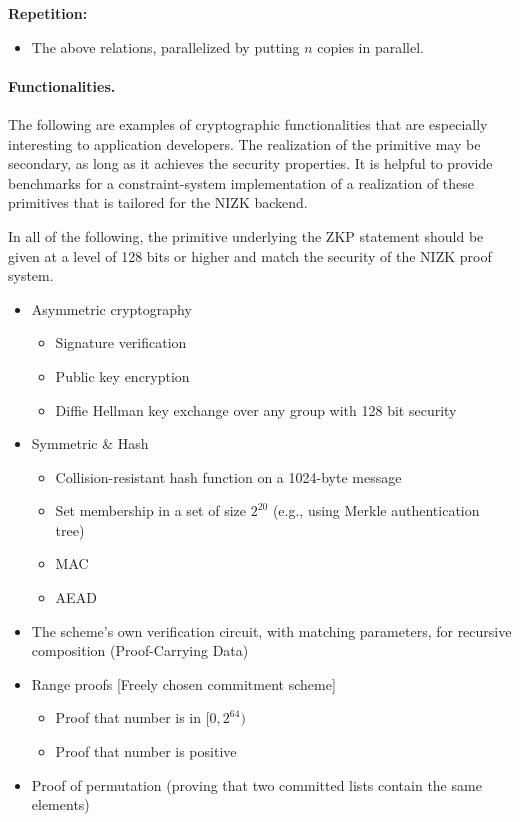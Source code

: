 \textbf{Repetition:}
\begin{itemize}
\item The above relations, parallelized by putting $n$ copies in parallel.
\end{itemize}


\paragraph{Functionalities.}

The following are examples of cryptographic functionalities that are especially interesting to application developers. 
The realization of the primitive may be secondary, as long as it achieves the security properties. 
It is helpful to provide benchmarks for a constraint-system implementation of a realization of these primitives that is tailored for the NIZK backend.

In all of the following, the primitive underlying the ZKP statement should be given at a level of 128 bits or higher and match the security of the NIZK proof system.
\begin{itemize}
    \item Asymmetric cryptography
				\begin{itemize}[label={- }]
        \item Signature verification
        \item Public key encryption
        \item Diffie Hellman key exchange over any group with 128 bit security
				\end{itemize}
    \item Symmetric \& Hash
				\begin{itemize}[label={- }]
        \item Collision-resistant hash function on a 1024-byte message
        \item Set membership in a set of size $2^{20}$ (e.g., using Merkle authentication tree)
        \item MAC
        \item AEAD
				\end{itemize}
    \item The scheme’s own verification circuit, with matching parameters, for recursive composition (Proof-Carrying Data)
    \item Range proofs [Freely chosen commitment scheme]
				\begin{itemize}[label={- }]
        \item Proof that number is in $[0, 2^{64})$ 
        \item Proof that number is positive
				\end{itemize}
    \item Proof of permutation (proving that two committed lists contain the same elements)
\end{itemize}




